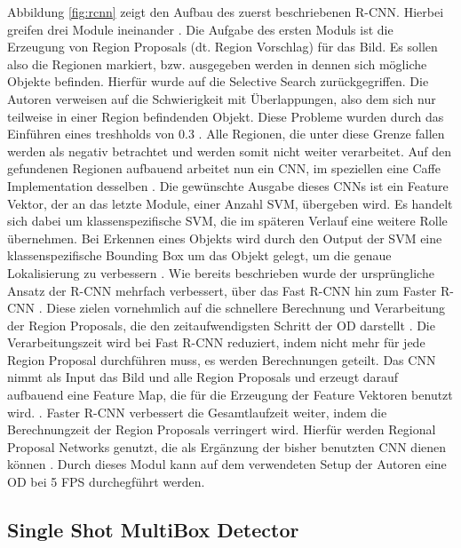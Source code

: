 Abbildung \ref{fig:rcnn} zeigt den Aufbau des zuerst beschriebenen \ac{R-CNN}. Hierbei greifen drei Module ineinander \cite[S.3-6]{Girshick.2016}. Die Aufgabe des ersten Moduls ist die Erzeugung von Region Proposals (dt. Region Vorschlag) für das Bild. Es sollen also die Regionen markiert, bzw. ausgegeben werden in dennen sich mögliche Objekte befinden. Hierfür wurde auf die Selective Search \cite{Uijlings.2013} zurückgegriffen. Die Autoren verweisen auf die Schwierigkeit mit Überlappungen, also dem sich nur teilweise in einer Region befindenden Objekt. Diese Probleme wurden durch das Einführen eines treshholds von 0.3 \cite[S.5]{Girshick.2016}. Alle Regionen, die unter diese Grenze fallen werden als negativ betrachtet und werden somit nicht weiter verarbeitet.
Auf den gefundenen Regionen aufbauend arbeitet nun ein \ac{CNN}, im speziellen eine Caffe Implementation desselben \cite{Jia.21.06.2014}. Die gewünschte Ausgabe dieses \ac{CNN}s ist ein Feature Vektor, der an das letzte Module, einer Anzahl \ac{SVM}, übergeben wird. Es handelt sich dabei um klassenspezifische \ac{SVM}, die im späteren Verlauf eine weitere Rolle übernehmen. Bei Erkennen eines Objekts wird durch den Output der \ac{SVM} eine klassenspezifische Bounding Box um das Objekt gelegt, um die genaue Lokalisierung zu verbessern \cite[S.12f.]{Girshick.2016}.
Wie bereits beschrieben wurde der ursprüngliche Ansatz der \ac{R-CNN} mehrfach verbessert, über das Fast \ac{R-CNN} \cite{Girshick.30.04.2015} hin zum Faster \ac{R-CNN} \cite{Ren.04.06.2015}. Diese zielen vornehmlich auf die schnellere Berechnung und Verarbeitung der Region Proposals, die den zeitaufwendigsten Schritt der \ac{OD} darstellt \cite[S.1]{Ren.04.06.2015}. Die Verarbeitungszeit wird bei Fast \ac{R-CNN} reduziert, indem nicht mehr für jede Region Proposal durchführen muss, es werden Berechnungen geteilt. Das \ac{CNN} nimmt als Input das Bild und alle Region Proposals und erzeugt darauf aufbauend eine Feature Map, die für die Erzeugung der Feature Vektoren benutzt wird. \cite[S.2f.]{Ren.04.06.2015}. Faster \ac{R-CNN} verbessert die Gesamtlaufzeit weiter, indem die Berechnungzeit der Region Proposals verringert wird. Hierfür werden Regional Proposal Networks genutzt, die als Ergänzung der bisher benutzten \ac{CNN} dienen können \cite[S.3f.]{Ren.04.06.2015}. Durch dieses Modul kann auf dem verwendeten Setup der Autoren eine \ac{OD} bei 5 \ac{FPS} durchegführt werden.

\subsection{Single Shot MultiBox Detector}

